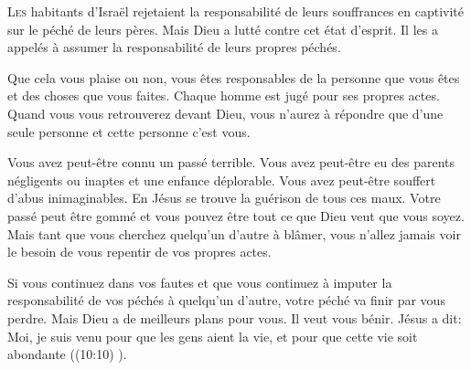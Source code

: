 \dvrule







\lettrine{L}{es} habitants d'Israël rejetaient la responsabilité
 de leurs souffrances en captivité sur le péché de leurs pères.
 Mais Dieu a lutté contre cet état d'esprit.
 Il les a appelés à assumer la responsabilité de leurs propres péchés. 

Que cela vous plaise ou non, vous êtes responsables de la personne
 que vous êtes et des choses que vous faites.
 Chaque homme est jugé pour ses propres actes.
 Quand vous vous retrouverez devant Dieu, 
 vous n'aurez à répondre que d'une seule personne
 \ocadr et cette personne c'est vous. 


Vous avez peut-être connu un passé terrible.
 Vous avez peut-être eu des parents négligents ou inaptes
 et une enfance déplorable. Vous avez peut-être souffert
 d'abus inimaginables. En Jésus se trouve la guérison de tous ces maux.
 Votre passé peut être gommé et vous pouvez être tout ce que Dieu
 veut que vous soyez. Mais tant que vous cherchez 
 quelqu'un d'autre à blâmer, vous n'allez jamais voir le besoin
 de vous repentir de vos propres actes. 

Si vous continuez dans vos fautes et que vous continuez
 à imputer la responsabilité de vos péchés à quelqu'un d'autre,
 votre péché va finir par vous perdre.
 Mais Dieu a de meilleurs plans pour vous. Il veut vous bénir.
 Jésus a dit: 
 \Og Moi, je suis venu pour que les gens aient la vie,
 et pour que cette vie soit abondante \Fg{} ((10:10) \BFC). 

